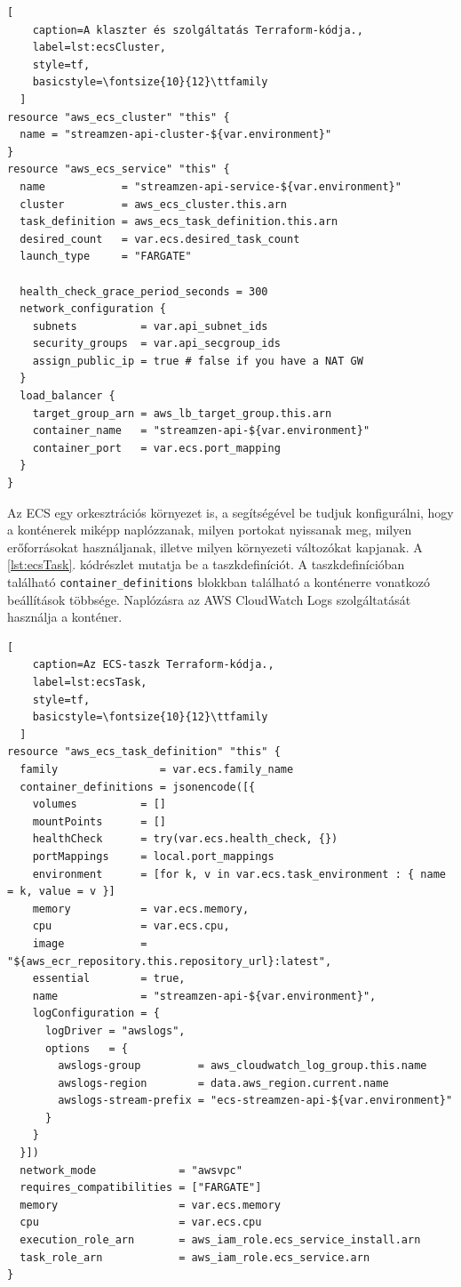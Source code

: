 \begin{minipage}{0.92\textwidth}
  \begin{lstlisting}[
    caption=A klaszter és szolgáltatás Terraform-kódja.,
    label=lst:ecsCluster,
    style=tf,
    basicstyle=\fontsize{10}{12}\ttfamily
  ]
resource "aws_ecs_cluster" "this" {
  name = "streamzen-api-cluster-${var.environment}"
}
resource "aws_ecs_service" "this" {
  name            = "streamzen-api-service-${var.environment}"
  cluster         = aws_ecs_cluster.this.arn
  task_definition = aws_ecs_task_definition.this.arn
  desired_count   = var.ecs.desired_task_count
  launch_type     = "FARGATE"

  health_check_grace_period_seconds = 300
  network_configuration {
    subnets          = var.api_subnet_ids
    security_groups  = var.api_secgroup_ids
    assign_public_ip = true # false if you have a NAT GW
  }
  load_balancer {
    target_group_arn = aws_lb_target_group.this.arn
    container_name   = "streamzen-api-${var.environment}"
    container_port   = var.ecs.port_mapping
  }
}
\end{lstlisting}
\end{minipage}

Az ECS egy orkesztrációs környezet is, a segítségével be tudjuk konfigurálni, hogy a konténerek miképp naplózzanak, milyen portokat nyissanak meg, milyen erőforrásokat használjanak, illetve milyen környezeti változókat kapjanak. A \ref{lst:ecsTask}. kódrészlet mutatja be a taszkdefiníciót. A taszkdefinícióban található \verb|container_definitions| blokkban található a konténerre vonatkozó beállítások többsége. Naplózásra az AWS CloudWatch Logs szolgáltatását használja a konténer.

\begin{minipage}{0.92\textwidth}
  \begin{lstlisting}[
    caption=Az ECS-taszk Terraform-kódja.,
    label=lst:ecsTask,
    style=tf,
    basicstyle=\fontsize{10}{12}\ttfamily
  ]
resource "aws_ecs_task_definition" "this" {
  family                = var.ecs.family_name
  container_definitions = jsonencode([{
    volumes          = []
    mountPoints      = []
    healthCheck      = try(var.ecs.health_check, {})
    portMappings     = local.port_mappings
    environment      = [for k, v in var.ecs.task_environment : { name = k, value = v }]
    memory           = var.ecs.memory,
    cpu              = var.ecs.cpu,
    image            = "${aws_ecr_repository.this.repository_url}:latest",
    essential        = true,
    name             = "streamzen-api-${var.environment}",
    logConfiguration = {
      logDriver = "awslogs",
      options   = {
        awslogs-group         = aws_cloudwatch_log_group.this.name
        awslogs-region        = data.aws_region.current.name
        awslogs-stream-prefix = "ecs-streamzen-api-${var.environment}"
      }
    }
  }])
  network_mode             = "awsvpc"
  requires_compatibilities = ["FARGATE"]
  memory                   = var.ecs.memory
  cpu                      = var.ecs.cpu
  execution_role_arn       = aws_iam_role.ecs_service_install.arn
  task_role_arn            = aws_iam_role.ecs_service.arn
}
\end{lstlisting}
\end{minipage}

